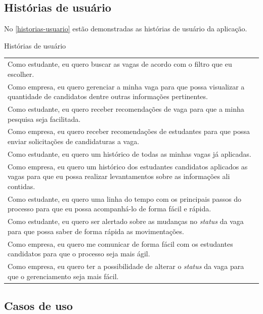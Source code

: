\subsection{Histórias de usuário}

No \autoref{historias-usuario} estão demonstradas as histórias de usuário da aplicação.

\begin{quadro}[H]
	\centering
	\ABNTEXfontereduzida
	\caption{Histórias de usuário}
	\label{historias-usuario}
	\begin{tabular}{ | p{15.0cm} | }
	\hline
	\thead{História} \\
	\hline
	 Como estudante, eu quero buscar as vagas de acordo com o filtro que eu escolher. \\
	 \hline
	 Como empresa, eu quero gerenciar a minha vaga para que possa visualizar a quantidade de candidatos dentre outras informações pertinentes. \\
	 \hline
	 Como estudante, eu quero receber recomendações de vaga para que a minha pesquisa seja facilitada. \\
	 \hline
	 Como empresa, eu quero receber recomendações de estudantes para que possa enviar solicitações de candidaturas a vaga. \\
	 \hline
	 Como estudante, eu quero um histórico de todas as minhas vagas já aplicadas. \\
	 \hline
	 Como empresa, eu quero um histórico dos estudantes candidatos aplicados as vagas para que eu possa realizar levantamentos sobre as informações ali contidas. \\
	 \hline
	 Como estudante, eu quero uma linha do tempo com os principais passos do processo para que eu possa acompanhá-lo de forma fácil e rápida. \\
	 \hline
	 Como estudante, eu quero ser alertado sobre as mudanças no \textit{status} da vaga para que possa saber de forma rápida as movimentações. \\
	 \hline
	 Como empresa, eu quero me comunicar de forma fácil com os estudantes candidatos para que o processo seja mais ágil. \\
	 \hline
	 Como empresa, eu quero ter a possibilidade de alterar o \textit{status} da vaga para que o gerenciamento seja mais fácil. \\
	 \hline
	\end{tabular}
\end{quadro}

\subsection{Casos de uso}

